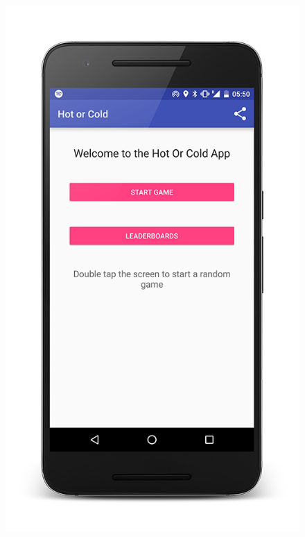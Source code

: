 \documentclass[10pt, a4paper]{article}
\begin{document}
\begin{figure}[!htb]
  \includegraphics[width=1.0\textwidth]{phone_mainscreen_1}
  \caption{}
\endminipage\hfill
{}%

\end{figure}
\end{document}
